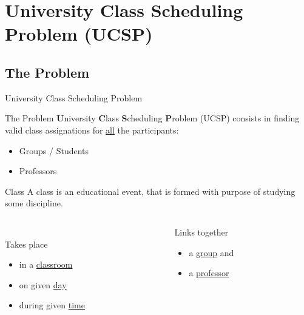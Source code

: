 \section{University Class Scheduling Problem (UCSP)}
\subsection{The Problem}

\begin{frame}{University Class Scheduling Problem}
  \begin{block}{The Problem}
    \textbf{U}niversity \textbf{C}lass \textbf{S}cheduling \textbf{P}roblem (UCSP)
    consists in finding valid \alert{class} assignations for \underline{all} the
    participants:
    \begin{itemize}
      \item Groups / Students
      \item Professors
    \end{itemize}
  \end{block}
  \begin{block}{Class}
    A class is an educational event, that is formed with purpose of studying
    some \alert{discipline}.
    \begin{columns}
      \begin{column}{4cm}
        \\Takes place
        \begin{itemize}
          \item in a \underline{classroom}
          \item on given \underline{day}
          \item during given \underline{time}
        \end{itemize}
      \end{column}
      \begin{column}{3cm}
        Links together
        \begin{itemize}
          \item a \underline{group} and
          \item a \underline{professor}
        \end{itemize}
      \end{column}
    \end{columns}

  \end{block}
\end{frame}

